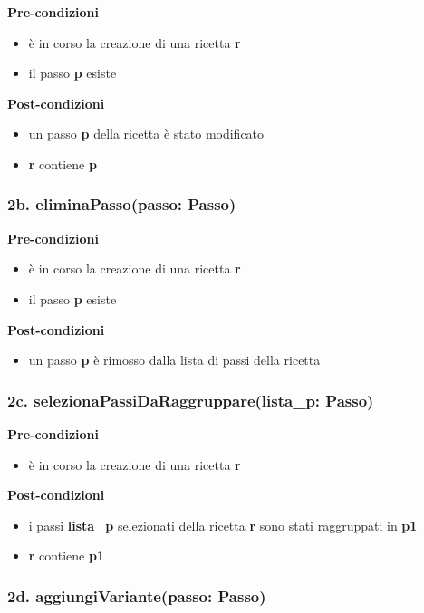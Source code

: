 \textbf{Pre-condizioni}
\begin{itemize}
  \item è in corso la creazione di una ricetta  \textbf{r}
  \item il passo  \textbf{p} esiste
\end{itemize}
\textbf{Post-condizioni}
\begin{itemize}
  \item un passo  \textbf{p} della ricetta è stato modificato
  \item  \textbf{r} contiene  \textbf{p}
\end{itemize}

\subsubsection*{2b. eliminaPasso(passo: Passo)}

\textbf{Pre-condizioni}
\begin{itemize}
  \item è in corso la creazione di una ricetta  \textbf{r}
  \item il passo  \textbf{p} esiste
\end{itemize}
\textbf{Post-condizioni}
\begin{itemize}
  \item un passo  \textbf{p} è rimosso dalla lista di passi della ricetta
\end{itemize}

\subsubsection*{2c. selezionaPassiDaRaggruppare(lista\_p: Passo)}

\textbf{Pre-condizioni}
\begin{itemize}
  \item è in corso la creazione di una ricetta  \textbf{r}
\end{itemize}
\textbf{Post-condizioni}
\begin{itemize}
  \item i passi  \textbf{lista\_p} selezionati della ricetta  \textbf{r} sono stati raggruppati in  \textbf{p1}
  \item  \textbf{r} contiene  \textbf{p1}
\end{itemize}

\subsubsection*{2d. aggiungiVariante(passo: Passo)}

